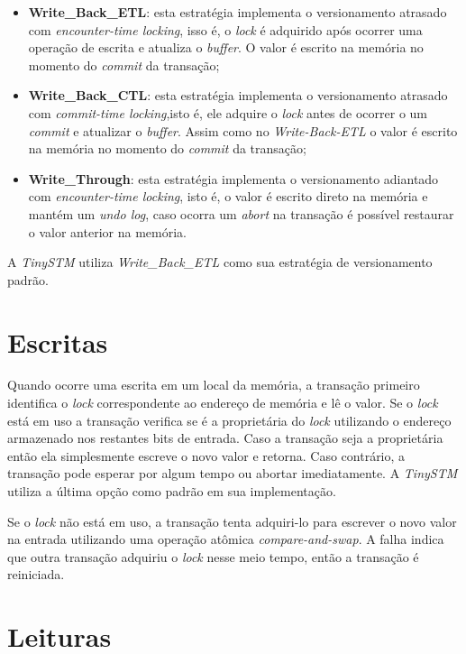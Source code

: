 \documentclass[diss,capa]{texufpel}
\begin{document}
\begin{itemize}
 \item \textbf{Write\_Back\_ETL}: esta estratégia implementa o versionamento atrasado com \emph{encounter-time locking}, isso é, o \emph{lock} é adquirido após ocorrer uma operação de escrita e atualiza o \emph{buffer}. O valor é escrito na memória no momento do \emph{commit} da transação;

 \item \textbf{Write\_Back\_CTL}: esta estratégia implementa o versionamento atrasado com \emph{commit-time locking},isto é, ele adquire o \emph{lock} antes de ocorrer o um \emph{commit} e atualizar o \emph{buffer}. Assim como no \emph{Write-Back-ETL} o valor é escrito na memória no momento do \emph{commit} da transação;

 \item \textbf{Write\_Through}: esta estratégia implementa o versionamento adiantado com \emph{encounter-time locking}, isto é, o valor é escrito direto na memória e mantém um \emph{undo log}, caso ocorra um \emph{abort} na transação é possível restaurar o valor anterior na memória.
\end{itemize}

A \emph{TinySTM} utiliza \emph{Write\_Back\_ETL} como sua estratégia de versionamento padrão.

\section{Escritas}

Quando ocorre uma escrita em um local da memória, a transação primeiro identifica o \emph{lock} correspondente ao endereço de memória e lê o valor. Se o \emph{lock} está em uso a transação verifica se é a proprietária do \emph{lock} utilizando o endereço armazenado nos restantes bits de entrada. Caso a transação seja a proprietária então ela simplesmente escreve o novo valor e retorna. Caso contrário, a transação pode esperar por algum tempo ou abortar imediatamente. A \emph{TinySTM} utiliza a última opção como padrão em sua implementação.

Se o \emph{lock} não está em uso, a transação tenta adquiri-lo para escrever o novo valor na entrada utilizando uma operação atômica \emph{compare-and-swap}. A falha indica que outra transação adquiriu o \emph{lock} nesse meio tempo, então a transação é reiniciada.


\section{Leituras}
\end{document}
